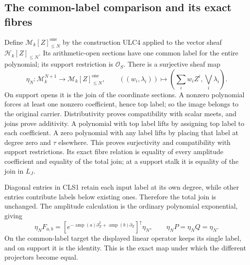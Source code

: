 \subsection{The common-label comparison and its exact fibres}
Define $\mathcal M_k[Z]_{\le N}^{\mathrm{one}}$ by the construction
ULC4 applied to the vector sheaf $\mathcal H_k[Z]_{\le N}$.
Its arithmetic-open sections have one common label for the entire
polynomial; its support restriction is $\mathcal O_S$.
There is a surjective sheaf map
\begin{equation}\tag{CLS7}
 \eta_N:\mathcal M_k^{N+1}\longrightarrow
 \mathcal M_k[Z]_{\le N}^{\mathrm{one}},\qquad
 ((w_i,\lambda_i))\longmapsto
       \left(\sum_iw_iZ^i,\bigvee_i\lambda_i\right).
\end{equation}
On support opens it is the join of the coordinate sections.
A nonzero polynomial forces at least one nonzero coefficient,
hence top label; so the image belongs to the original carrier.
Distributivity proves compatibility with scalar meets, and joins
prove additivity. A polynomial with top label lifts by assigning
top label to each coefficient. A zero polynomial with any label
lifts by placing that label at degree zero and $\tau$ elsewhere.
This proves surjectivity and compatibility with support restrictions.
Its exact fibre relation is equality of every amplitude coefficient
and equality of the total join; at a support stalk it is equality
of the join in $L_J$.

Diagonal entries in CLS1 retain each input label at its own degree,
while other entries contribute labels below existing ones. Therefore
the total join is unchanged. The amplitude calculation is the
ordinary polynomial exponential, giving
\begin{equation}\tag{CLS8}
 \eta_NF_{a,b}=
 \left[e^{-\operatorname{amp}(a)\partial_Z^2+
                   \operatorname{amp}(b)\partial_Z}\right]^\uparrow
 \eta_N,\qquad \eta_NP=\eta_NQ=\eta_N.
\end{equation}
On the common-label target the displayed linear operator keeps its
single label, and on support it is the identity. This is the exact
map under which the different projectors become equal.

